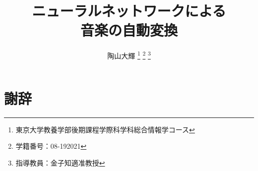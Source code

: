 \documentclass[dvipdfmx]{jreport}
\title{ニューラルネットワークによる\\ 音楽の自動変換}
\author{陶山大輝 \thanks{東京大学教養学部後期課程学際科学科総合情報学コース} \thanks{学籍番号：08-192021} \thanks{指導教員：金子知適准教授}}
\begin{document}
\maketitle




\tableofcontents














\chapter*{謝辞}




\end{document}
